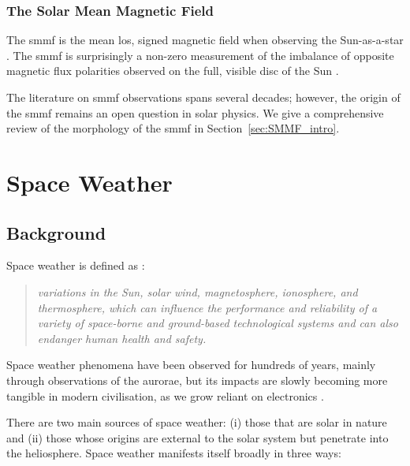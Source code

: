 \subsubsection*{The Solar Mean Magnetic Field}

The \gls{smmf} is the mean \gls{los}, signed magnetic field when observing the Sun-as-a-star \citep{scherrer_mean_1977, scherrer_mean_1977-1, garcia_integrated_1999}. The \gls{smmf} is surprisingly a non-zero measurement of the imbalance of opposite magnetic flux polarities observed on the full, visible disc of the Sun \citep{svalgaard_suns_1975}.

The literature on \gls{smmf} observations spans several decades; however, the origin of the \gls{smmf} remains an open question in solar physics. We give a comprehensive review of the morphology of the \gls{smmf} in Section~\ref{sec:SMMF_intro}.





\section{Space Weather}\label{sec:intro_SW}

\subsection{Background}
Space weather is defined as \citep{cannon_extreme_2013}:

\begin{quote}
	\textit{variations in the Sun, solar wind, magnetosphere, ionosphere, and thermosphere, which can influence the performance and reliability of a variety of space-borne and ground-based technological systems and can also endanger human health and safety.}
\end{quote}

Space weather phenomena have been observed for hundreds of years, mainly through observations of the aurorae, but its impacts are slowly becoming more tangible in modern civilisation, as we grow reliant on electronics \citep{beggan_ground_2018}.

There are two main sources of space weather: (i) those that are solar in nature and (ii) those whose origins are external to the solar system but penetrate into the heliosphere. Space weather manifests itself broadly in three ways:

